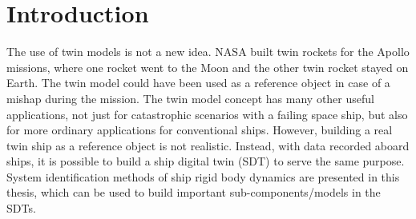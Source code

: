 \chapter{Introduction}
The use of twin models is not a new idea. NASA built twin rockets for the Apollo missions, where one rocket went to the Moon and the other twin rocket stayed on Earth.
The twin model could have been used as a reference object in case of a mishap during the mission.  
The twin model concept has many other useful applications, not just for catastrophic scenarios with a failing space ship, but also for more ordinary applications for conventional ships. However, building a real twin ship as a reference object is not realistic. Instead, with data recorded aboard ships, it is possible to build a ship digital twin (SDT) to serve the same purpose.
System identification methods of ship rigid body dynamics are presented in this thesis, which can be used to build important sub-components/models in the SDTs. 

